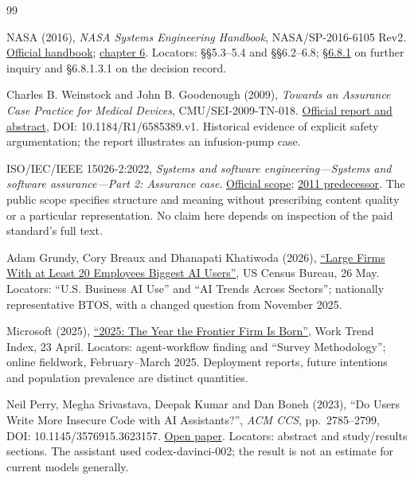 \documentclass[11pt,a4paper]{article}
\begin{document}
\FloatBarrier
\begin{thebibliography}{99}
\small
\raggedright
{}
\setlength{\parskip}{0pt}
\setlength{\itemsep}{4pt}
NASA (2016), \emph{NASA Systems Engineering Handbook}, NASA/SP-2016-6105 Rev2. \href{https://www.nasa.gov/wp-content/uploads/2018/09/nasa_systems_engineering_handbook_0.pdf}{Official handbook}; \href{https://www.nasa.gov/reference/6-0-crosscutting-technical-management/}{chapter 6}. Locators: §§5.3--5.4 and §§6.2--6.8; \href{https://www.nasa.gov/reference/6-8-decision-analysis/}{§6.8.1} on further inquiry and §6.8.1.3.1 on the decision record.

Charles B. Weinstock and John B. Goodenough (2009), \emph{Towards an Assurance Case Practice for Medical Devices}, CMU/SEI-2009-TN-018. \href{https://sei.cmu.edu/library/towards-an-assurance-case-practice-for-medical-devices/}{Official report and abstract}, DOI: 10.1184/R1/6585389.v1. Historical evidence of explicit safety argumentation; the report illustrates an infusion-pump case.

ISO/IEC/IEEE 15026-2:2022, \emph{Systems and software engineering---Systems and software assurance---Part 2: Assurance case}. \href{https://standards.ieee.org/ieee/15026-2/10236/}{Official scope}; \href{https://standards.ieee.org/ieee/15026-2/5234/}{2011 predecessor}. The public scope specifies structure and meaning without prescribing content quality or a particular representation. No claim here depends on inspection of the paid standard's full text.

Adam Grundy, Cory Breaux and Dhanapati Khatiwoda (2026), \href{https://www.census.gov/library/stories/2026/05/ai-use-businesses.html}{``Large Firms With at Least 20 Employees Biggest AI Users''}, US Census Bureau, 26 May. Locators: ``U.S. Business AI Use'' and ``AI Trends Across Sectors''; nationally representative BTOS, with a changed question from November 2025.

Microsoft (2025), \href{https://www.microsoft.com/en-us/worklab/work-trend-index/2025-the-year-the-frontier-firm-is-born}{``2025: The Year the Frontier Firm Is Born''}, Work Trend Index, 23 April. Locators: agent-workflow finding and ``Survey Methodology''; online fieldwork, February--March 2025. Deployment reports, future intentions and population prevalence are distinct quantities.

Neil Perry, Megha Srivastava, Deepak Kumar and Dan Boneh (2023), ``Do Users Write More Insecure Code with AI Assistants?'', \emph{ACM CCS}, pp.~2785--2799, DOI: 10.1145/3576915.3623157. \href{https://arxiv.org/abs/2211.03622}{Open paper}. Locators: abstract and study/results sections. The assistant used codex-davinci-002; the result is not an estimate for current models generally.


\end{thebibliography}
\end{document}
